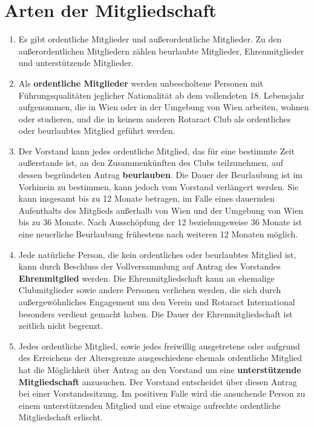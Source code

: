 \documentclass{statutclass}
\begin{document}
\section{Arten der Mitgliedschaft}
\begin{enumerate}
    \item Es gibt ordentliche Mitglieder und außerordentliche Mitglieder. Zu den außerordentlichen Mitgliedern zählen beurlaubte Mitglieder, Ehrenmitglieder und unterstützende Mitglieder.
    \item Als \textbf{ordentliche Mitglieder} werden unbescholtene Personen mit Führungsqualitäten jeglicher Nationalität ab dem vollendeten 18. Lebensjahr aufgenommen, die in Wien oder in der Umgebung von Wien arbeiten, wohnen oder studieren, und die in keinem anderen Rotaract Club als ordentliches oder beurlaubtes Mitglied geführt werden.
    \item Der Vorstand kann jedes ordentliche Mitglied, das für eine bestimmte Zeit außerstande ist, an den Zusammenkünften des Clubs teilzunehmen, auf dessen begründeten Antrag \textbf{beurlauben}. Die Dauer der Beurlaubung ist im Vorhinein zu bestimmen, kann jedoch vom Vorstand verlängert werden. Sie kann insgesamt bis zu 12 Monate betragen, im Falle eines dauernden Aufenthalts des Mitglieds außerhalb von Wien und der Umgebung von Wien bis zu 36 Monate. Nach Ausschöpfung der 12 beziehungsweise 36 Monate ist eine neuerliche Beurlaubung frühestens nach weiteren 12 Monaten möglich.
    \item Jede natürliche Person, die kein ordentliches oder beurlaubtes Mitglied ist, kann durch Beschluss der Vollversammlung auf Antrag des Vorstandes \textbf{Ehrenmitglied} werden. Die Ehrenmitgliedschaft kann an ehemalige Clubmitglieder sowie andere Personen verliehen werden, die sich durch außergewöhnliches Engagement um den Verein und Rotaract International besonders verdient gemacht haben. Die Dauer der Ehrenmitgliedschaft ist zeitlich nicht begrenzt.
    \item Jedes ordentliche Mitglied, sowie jedes freiwillig ausgetretene oder aufgrund des Erreichens der Altersgrenze ausgeschiedene ehemals ordentliche Mitglied hat die Möglichkeit über Antrag an den Vorstand um eine \textbf{unterstützende Mitgliedschaft} anzusuchen. Der Vorstand entscheidet über diesen Antrag bei einer Vorstandssitzung. Im positiven Falle wird die ansuchende Person zu einem unterstützenden Mitglied und eine etwaige aufrechte ordentliche Mitgliedschaft erlischt.
\end{enumerate}
\end{document}
